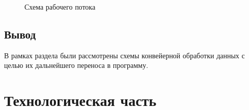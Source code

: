 \documentclass[a4paper,12pt]{report}
\begin{document}
		\begin{figure}[h!]
			\caption{Схема рабочего потока}
			\label{ris:conv3}
		\end{figure}

    \newpage
    
    \section{Вывод}
    
    В рамках раздела были рассмотрены схемы конвейерной обработки данных с целью их дальнейшего переноса в программу.
    
    \newpage

    \chapter{Технологическая часть}
    
\end{document}

